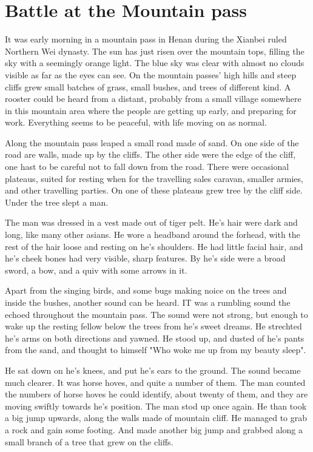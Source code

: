 \chapter{Battle at the Mountain pass}

It was early morning in a mountain pass in Henan during the Xianbei ruled Northern Wei dynasty. The sun has just risen over the mountain tops, filling the sky with a seemingly orange light. The blue sky was clear with almost no clouds visible as far as the eyes can see. On the mountain passes' high hills and steep cliffs grew small batches of grass, small bushes, and trees of different kind.
A rooster could be heard from a distant, probably from a small village somewhere in this mountain area where the people are getting up early, and preparing for work. Everything seems to be peaceful, with life moving on as normal.

Along the mountain pass leaped a small road made of sand. On one side of the road are walls, made up by the cliffs. The other side were the edge of the cliff, one hast to be careful not to fall down from the road. There were occasional plateaus, suited for resting when for the travelling sales caravan, smaller armies, and other travelling parties. On one of these plateaus grew tree by the cliff side. Under the tree slept a man.

The man was dressed in a vest made out of tiger pelt. He's hair were dark and long, like many other asians. He wore a headband around the forhead, with the rest of the hair loose and resting on he's shoulders. He had little facial hair, and he's cheek bones had very visible, sharp features. By he's side were a broad sword, a bow, and a quiv with some arrows in it.

Apart from the singing birds, and some bugs making noice on the trees and inside the bushes, another sound can be heard. IT was a rumbling sound the echoed throughout the mountain pass. The sound were not strong, but enough to wake up the resting fellow below the trees from he's sweet dreams. He strechted he's arms on both directions and yawned. He stood up, and dusted of he's pants from the sand, and thought to himself "Who woke me up from my beauty sleep".

He sat down on he's knees, and put he's ears to the ground. The sound became much clearer. It was horse hoves, and quite a number of them. The man counted the numbers of horse hoves he could identify, about twenty of them, and they are moving swiftly towards he's position. The man stod up once again. He than took a big jump upwards, along the walls made of mountain cliff. He managed to grab a rock and gain some footing. And made another big jump and grabbed along a small branch of a tree that grew on the cliffs.

